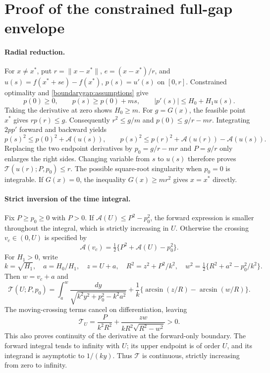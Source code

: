 \section{Proof of the constrained full-gap envelope}
\label{boundarygap:proof}

\paragraph{Radial reduction.}
For $x\ne x^*$, put $r=\|x-x^*\|$, $e=(x-x^*)/r$, and
$u(s)=f(x^*+se)-f(x^*)$, $p(s)=u'(s)$ on $[0,r]$.
Constrained optimality and \eqref{boundarygap:assumptions} give
\[
 p(0)\ge0,\qquad p(s)\ge p(0)+ms,\qquad
 |p'(s)|\le H_0+H_1u(s).
\]
Taking the derivative at zero shows $H_0\ge m$.
For $g=G(x)$, the feasible point $x^*$ gives $rp(r)\le g$.
Consequently $r^2\le g/m$ and
$p(0)\le g/r-mr$.  Integrating $2pp'$ forward and backward yields
\[
 p(s)^2\le p(0)^2+\mathcal A(u(s)),\qquad
 p(s)^2\le p(r)^2+\mathcal A(u(r))-\mathcal A(u(s)).
\]
Replacing the two endpoint derivatives by $p_0=g/r-mr$ and $P=g/r$
only enlarges the right sides.  Changing variable from $s$ to $u(s)$
therefore proves $\mathcal T(u(r);P,p_0)\le r$.
The possible square-root singularity when $p_0=0$ is integrable.
If $G(x)=0$, the inequality $G(x)\ge mr^2$ gives $x=x^*$ directly.

\paragraph{Strict inversion of the time integral.}
Fix $P\ge p_0\ge0$ with $P>0$.  If
$\mathcal A(U)\le P^2-p_0^2$, the forward expression is smaller
throughout the integral, which is strictly increasing in $U$.
Otherwise the crossing $v_c\in(0,U)$ is specified by
\[
 \mathcal A(v_c)=\tfrac12\{P^2+\mathcal A(U)-p_0^2\}.
\]
For $H_1>0$, write
\[
 k=\sqrt{H_1},\quad a=H_0/H_1,\quad z=U+a,\quad
 R^2=z^2+P^2/k^2,\quad
 w^2=\tfrac12\{R^2+a^2-p_0^2/k^2\}.
\]
Then $w=v_c+a$ and
\[
 \mathcal T(U;P,p_0)=
 \int_a^w\frac{dy}{\sqrt{k^2y^2+p_0^2-k^2a^2}}
 +\frac1k\{\arcsin(z/R)-\arcsin(w/R)\}.
\]
The moving-crossing terms cancel on differentiation, leaving
\begin{equation}\label{boundarygap:time-derivative}
 \mathcal T_U=
 \frac{P}{k^2R^2}+
 \frac{zw}{kR^2\sqrt{R^2-w^2}}>0.
\end{equation}
This also proves continuity of the derivative at the forward-only
boundary.  The forward integral tends to infinity with $U$; its upper
endpoint is of order $U$, and its integrand is asymptotic to $1/(ky)$.
Thus $\mathcal T$ is continuous, strictly increasing from zero to
infinity.

